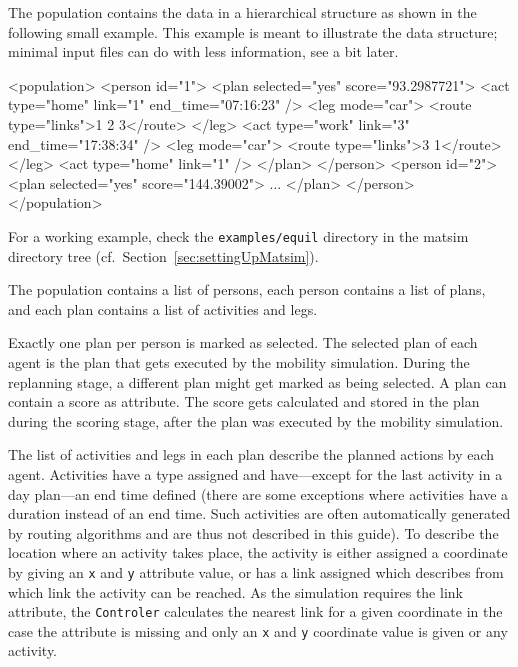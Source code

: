 The population contains the data in a hierarchical structure as shown in the following small example.  This example is meant to illustrate the data structure; minimal input files can do with less information, see a bit later.
\begin{xml}
<population> 
   <person id="1"> 
      <plan selected="yes" score="93.2987721"> 
         <act type="home" link="1" end_time="07:16:23" /> 
         <leg mode="car"> 
            <route type="links">1 2 3</route> 
         </leg> 
         <act type="work" link="3" end_time="17:38:34" /> 
         <leg mode="car"> 
            <route type="links">3 1</route> 
         </leg> 
         <act type="home" link="1" /> 
      </plan> 
   </person> 
   <person id="2"> 
      <plan selected="yes" score="144.39002"> 
         ...
      </plan> 
   </person> 
</population>
\end{xml}
For a working example, check the \lstinline{examples/equil} directory in the \gls{matsim} directory tree (cf.\ Section~\ref{sec:settingUpMatsim}).

The population contains a list of persons, each person contains a list of plans, and each plan contains a list of activities and legs.

Exactly one \gls{plan} per person is marked as selected. The selected plan of each agent is the plan that gets executed by the mobility simulation. During the \gls{replanning} stage, a different plan might get marked as being selected. A \gls{plan} can contain a score as attribute. The score gets calculated and stored in the plan during the scoring stage, after the plan was executed by the mobility simulation.

The list of activities and legs in each plan describe the planned actions by each agent. Activities have a type assigned and have---except for the last activity in a day plan---an end time defined (there are some exceptions where activities have a duration instead of an end time. Such activities are often automatically generated by routing algorithms and are thus not described in this guide). To describe the location where an activity takes place, the activity is either assigned a coordinate by giving an \lstinline|x| and \lstinline|y| attribute value, or has a link assigned which describes from which link the activity can be reached. As the simulation requires the link attribute, the \lstinline|Controler| calculates the nearest link for a given coordinate in the case the attribute is missing and only an \lstinline|x| and \lstinline|y| coordinate value is given or any activity.

